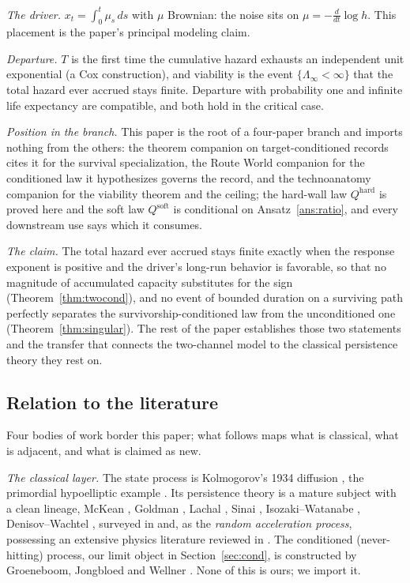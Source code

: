 \emph{The driver.} $x_t=\int_0^t\mu_s\,ds$ with $\mu$ Brownian: the
noise sits on $\mu=-\frac{d}{dt}\log h$. This placement is the paper's
principal modeling claim.

\emph{Departure.} $T$ is the first time the cumulative hazard exhausts
an independent unit exponential (a Cox construction), and viability is
the event $\{\Lambda_\infty<\infty\}$ that the total hazard ever
accrued stays finite. Departure with probability one and infinite life
expectancy are compatible, and both hold in the critical case.

\emph{Position in the branch.} This paper is the root of a four-paper
branch and imports nothing from the others: the theorem companion on
target-conditioned records cites it for the survival specialization,
the Route World companion for the conditioned law it hypothesizes
governs the record, and the technoanatomy companion for the viability
theorem and the ceiling; the hard-wall law $Q^{\mathrm{hard}}$ is
proved here and the soft law $Q^{\mathrm{soft}}$ is conditional on
Ansatz~\ref{ans:ratio}, and every downstream use says which it consumes.

\emph{The claim.} The total hazard ever accrued stays finite exactly when
the response exponent is positive and the driver's long-run behavior is
favorable, so that no magnitude of accumulated capacity substitutes for
the sign (Theorem~\ref{thm:twocond}), and no event of bounded duration on a
surviving path perfectly separates the survivorship-conditioned law
from the unconditioned one (Theorem~\ref{thm:singular}). The rest of the
paper establishes those two statements and the transfer that connects
the two-channel model to the classical persistence theory they rest
on.

\subsection{Relation to the literature}
Four bodies of work border this paper; what follows maps what is
classical, what is adjacent, and what is claimed as new.

\emph{The classical layer.} The state process is Kolmogorov's 1934
diffusion \cite{Kol34}, the primordial hypoelliptic example
\cite{Hor67}. Its persistence theory is a mature subject with a clean
lineage, McKean \cite{McK63}, Goldman \cite{Gol71}, Lachal
\cite{Lac91}, Sinai \cite{Sin92}, Isozaki--Watanabe \cite{IW94},
Denisov--Wachtel \cite{DW15}, surveyed in \cite{AS15} and, as the
\emph{random acceleration process}, possessing an extensive physics
literature reviewed in \cite{BMS13}. The conditioned (never-hitting)
process, our limit object in Section~\ref{sec:cond}, is constructed by
Groeneboom, Jongbloed and Wellner \cite{GJW99}. None of this is ours;
we import it.

